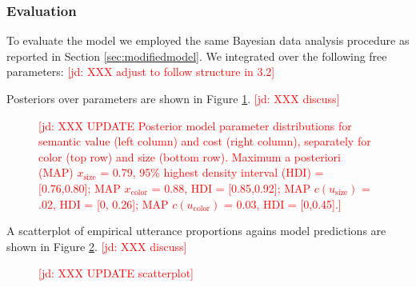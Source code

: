 \documentclass[11pt]{article}
\newcommand{\jd}[1]{\textcolor{Red}{[jd: #1]}}
\newcommand{\figref}[1]{Figure \ref{#1}}
\newcommand{\sectionref}[1]{Section \ref{#1}}
\begin{document}
\subsubsection{Evaluation}


To evaluate the model we employed the same Bayesian data analysis procedure as reported in \sectionref{sec:modifiedmodel}. We integrated over the following free parameters: \jd{XXX adjust to follow structure in 3.2}

Posteriors over parameters are shown in \figref{fig:typparamposteriors}. \jd{XXX discuss}

\begin{figure}
\centering
\caption{\jd{XXX UPDATE Posterior model parameter distributions for semantic value (left column) and cost (right column), separately for color (top row) and size (bottom row). Maximum a posteriori (MAP)  $x_{\textrm{size}}$ = 0.79, 95\% highest density interval (HDI) = [0.76,0.80]; MAP $x_{\textrm{color}}$ = 0.88, HDI = [0.85,0.92]; MAP $c(u_{\textrm{size}})$ = .02, HDI = [0, 0.26]; MAP $c(u_{\textrm{color}})$ = 0.03, HDI = [0,0.45].}}
\label{fig:typparamposteriors}
\end{figure}

A scatterplot of empirical utterance proportions agains model predictions are shown in \figref{fig:typpredictives}. \jd{XXX discuss}


\begin{figure}
\centering
\caption{\jd{XXX UPDATE scatterplot}}
\label{fig:typpredictives}
\end{figure}
\end{document}
